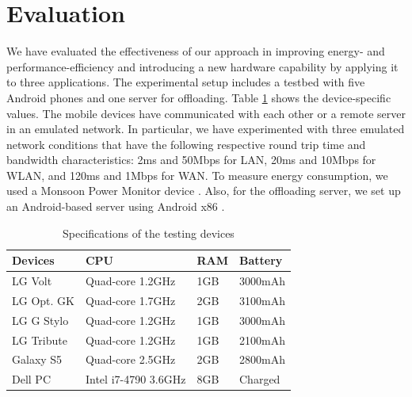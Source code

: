 \documentclass{sig-alternate}
\begin{document}
  
\section{Evaluation}
\label{sec:eval}
We have evaluated the effectiveness of our approach in improving energy- and performance-efficiency and introducing a new hardware capability by applying it to three applications. The experimental setup includes a testbed with five Android phones and one server for offloading. Table \ref{table:devices} shows the device-specific values. The mobile devices have communicated with each other or a remote server in an emulated network. In particular, we have experimented with three emulated network conditions that have the following respective round trip time and bandwidth characteristics: 2ms and 50Mbps for LAN, 20ms and 10Mbps for WLAN, and 120ms and 1Mbps for WAN. To measure energy consumption, we used a Monsoon Power Monitor device \cite{moosoon}. Also, for the offloading server, we set up an Android-based server using Android x86 \cite{android-x86}.

\begin{table}[h]
\caption{Specifications of the testing devices}
\label{table:devices}
\centering \small
\begin{tabular}{| l | l | l | l |}
    \hline
    \textbf{Devices} & \textbf{CPU} & \textbf{RAM} & \textbf{Battery} \\ \hline \hline
    LG Volt & Quad-core 1.2GHz & 1GB & 3000mAh\\ \hline
		LG Opt. GK & Quad-core 1.7GHz & 2GB & 3100mAh\\ \hline
		LG G Stylo & Quad-core 1.2GHz & 1GB & 3000mAh\\ \hline
		LG Tribute & Quad-core 1.2GHz & 1GB & 2100mAh\\ \hline
		Galaxy S5 & Quad-core 2.5GHz & 2GB & 2800mAh\\ \hline
		Dell PC & Intel i7-4790 3.6GHz & 8GB & Charged\\ \hline
\end{tabular}
\end{table}
\end{document}
